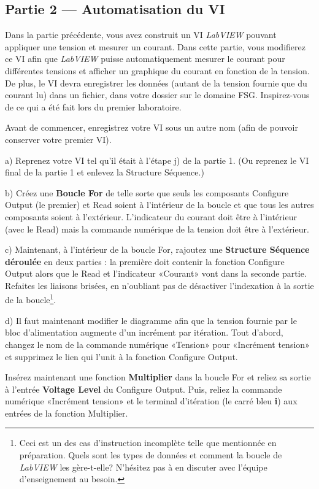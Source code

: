 \documentclass[canadien,12pt,oneside,letterpaper]{article}
\begin{document}
\subsection{Partie 2 --- Automatisation du VI}

Dans la partie précédente, vous avez construit un VI \textit{LabVIEW} pouvant appliquer une tension et mesurer un courant. Dans cette partie, vous modifierez ce VI afin que \textit{LabVIEW} puisse automatiquement mesurer le courant pour différentes tensions et afficher un graphique du courant en fonction de la tension. De plus, le VI devra enregistrer les données (autant de la tension fournie que du courant lu) dans un fichier, dans votre dossier sur le domaine FSG. Inspirez-vous de ce qui a été fait lors du premier laboratoire.

Avant de commencer, enregistrez votre VI sous un autre nom (afin de pouvoir conserver votre premier VI).

a) Reprenez votre VI tel qu'il était à l'étape j) de la partie 1. (Ou reprenez le VI final de la partie 1 et enlevez la Structure Séquence.)

b) Créez une \textbf{Boucle For} de telle sorte que seuls les composants Configure Output (le premier) et Read soient à l'intérieur de la boucle et que tous les autres composants soient à l'extérieur. L'indicateur du courant doit être à l'intérieur (avec le Read) mais la commande numérique de la tension doit être à l'extérieur.

c) Maintenant, à l'intérieur de la boucle For, rajoutez une \textbf{Structure Séquence déroulée} en deux parties : la première doit contenir la fonction Configure Output alors que le Read et l'indicateur «Courant» vont dans la seconde partie. Refaites les liaisons brisées, en n'oubliant pas de désactiver l'indexation à la sortie de la boucle\footnote{Ceci est un des cas d'instruction incomplète telle que mentionnée en préparation. Quels sont les types de données et comment la boucle de \textit{LabVIEW} les gère-t-elle? N'hésitez pas à en discuter avec l'équipe d'enseignement au besoin.}.

d) Il faut maintenant modifier le diagramme afin que la tension fournie par le bloc d'alimentation augmente d'un incrément par itération. Tout d'abord, changez le nom de la commande numérique «Tension» pour «Incrément tension» et supprimez le lien qui l'unit à la fonction Configure Output.

Insérez maintenant une fonction \textbf{Multiplier} dans la boucle For et reliez sa sortie à l'entrée \textbf{Voltage Level} du Configure Output. Puis, reliez la commande numérique «Incrément tension» et le terminal d'itération (le carré bleu \textbf{i}) aux entrées de la fonction Multiplier.
\end{document}

